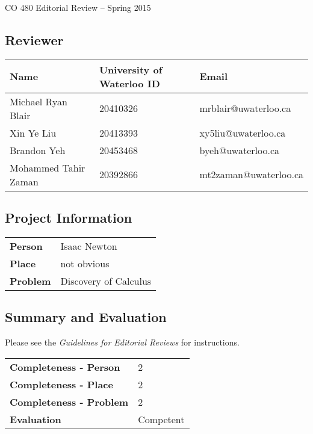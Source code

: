 \documentclass[11pt]{article}
\begin{document}
\begin{center}
{\Large CO 480 Editorial Review -- Spring 2015} 
\end{center}

\subsection*{Reviewer} %
\begin{tabular}{|l|l|l|} \hline
\textbf{Name} & \textbf{University of Waterloo ID} & \textbf{Email} \\ \hline
Michael Ryan Blair & 20410326 & mrblair@uwaterloo.ca \\ \hline
Xin Ye Liu & 20413393 & xy5liu@uwaterloo.ca\\ \hline
Brandon Yeh & 20453468 & byeh@uwaterloo.ca\\ \hline
Mohammed Tahir Zaman & 20392866 & mt2zaman@uwaterloo.ca\\ \hline
\end{tabular}

\subsection*{Project Information} %
\begin{tabular}{ll}
{\bf Person}  & Isaac Newton \\
{\bf Place}   & not obvious \\
{\bf Problem} & Discovery of Calculus \\
\end{tabular}

\subsection*{Summary and Evaluation}
Please see the {\em Guidelines for Editorial Reviews} for instructions.

\begin{tabular}{ll}
{\bf Completeness - Person}  & 2 \\
{\bf Completeness - Place}   & 2 \\
{\bf Completeness - Problem} & 2 \\
{\bf Evaluation}             & Competent \\
\end{tabular}
\end{document}
